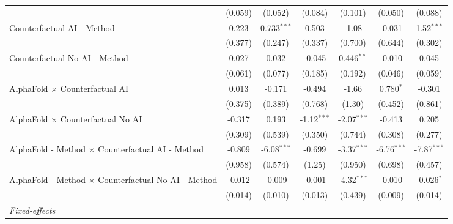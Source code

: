 \begin{tabular}{lcccccc}
                                                              & (0.059)      & (0.052)       & (0.084)       & (0.101)       & (0.050)       & (0.088)\\   
   Counterfactual AI - Method                                 & 0.223        & 0.733$^{***}$ & 0.503         & -1.08         & -0.031        & 1.52$^{***}$\\   
                                                              & (0.377)      & (0.247)       & (0.337)       & (0.700)       & (0.644)       & (0.302)\\   
   Counterfactual No AI - Method                              & 0.027        & 0.032         & -0.045        & 0.446$^{**}$  & -0.010        & 0.045\\   
                                                              & (0.061)      & (0.077)       & (0.185)       & (0.192)       & (0.046)       & (0.059)\\   
   AlphaFold $\times$ Counterfactual AI                       & 0.013        & -0.171        & -0.494        & -1.66         & 0.780$^{*}$   & -0.301\\   
                                                              & (0.375)      & (0.389)       & (0.768)       & (1.30)        & (0.452)       & (0.861)\\   
   AlphaFold $\times$ Counterfactual No AI                    & -0.317       & 0.193         & -1.12$^{***}$ & -2.07$^{***}$ & -0.413        & 0.205\\   
                                                              & (0.309)      & (0.539)       & (0.350)       & (0.744)       & (0.308)       & (0.277)\\   
   AlphaFold - Method $\times$ Counterfactual AI - Method     & -0.809       & -6.08$^{***}$ & -0.699        & -3.37$^{***}$ & -6.76$^{***}$ & -7.87$^{***}$\\   
                                                              & (0.958)      & (0.574)       & (1.25)        & (0.950)       & (0.698)       & (0.457)\\   
   AlphaFold - Method $\times$ Counterfactual No AI - Method  & -0.012       & -0.009        & -0.001        & -4.32$^{***}$ & -0.010        & -0.026$^{*}$\\   
                                                              & (0.014)      & (0.010)       & (0.013)       & (0.439)       & (0.009)       & (0.014)\\   
   \midrule
   \emph{Fixed-effects}\\

\end{tabular}
